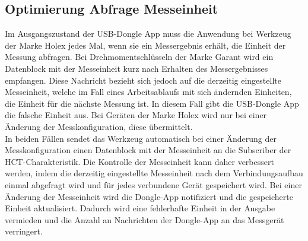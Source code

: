 \subsection{Optimierung Abfrage Messeinheit} 
Im Ausgangszustand der USB-Dongle App muss die Anwendung bei Werkzeug der Marke Holex jedes Mal, wenn sie ein Messergebnis erhält, die Einheit der Messung abfragen. Bei Drehmomentschlüsseln der Marke Garant wird ein Datenblock mit der Messeinheit kurz nach Erhalten des Messergebnisses empfangen. Diese Nachricht bezieht sich jedoch auf die derzeitig eingestellte Messeinheit, welche im Fall eines Arbeitsablaufs mit sich ändernden Einheiten, die Einheit für die nächste Messung ist. In diesem Fall gibt die USB-Dongle App die falsche Einheit aus. Bei Geräten der Marke Holex wird nur bei einer Änderung der Messkonfiguration, diese übermittelt.\\
In beiden Fällen sendet das Werkzeug automatisch bei einer Änderung der Messkonfiguration einen Datenblock mit der Messeinheit an die Subscriber der HCT-Charakteristik. Die Kontrolle der Messeinheit kann daher verbessert werden, indem die derzeitig eingestellte Messeinheit nach dem Verbindungsaufbau einmal abgefragt wird und für jedes verbundene Gerät gespeichert wird. Bei einer Änderung der Messeinheit wird die Dongle-App notifiziert und die gespeicherte Einheit aktualisiert. Dadurch wird eine fehlerhafte Einheit in der Ausgabe vermieden und die Anzahl an Nachrichten der Dongle-App an das Messgerät verringert.

